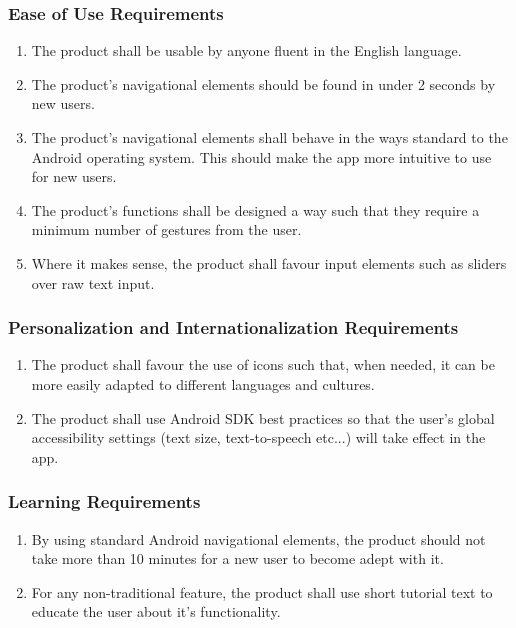 \documentclass[]{article}
\begin{document}
\subsubsection{Ease of Use Requirements}
\label{ssub:ease_of_use_requirements}
\begin{enumerate}[{UH}1. ]
	\item The product shall be usable by anyone fluent in the English language.
	\item The product's navigational elements should be found in under 2 seconds by new users.
	\item The product's navigational elements shall behave in the ways standard to the Android operating system. This should make the app more intuitive to use for new users. 
	\item The product's functions shall be designed a way such that they require a minimum number of gestures from the user.
	\item Where it makes sense, the product shall favour input elements such as sliders over raw text input.
	\holdEnum
\end{enumerate}

\subsubsection{Personalization and Internationalization Requirements}
\label{ssub:personalization_and_internationalization_requirements}
\begin{enumerate}[{UH}1. ]
	\resumeEnum
	\item The product shall favour the use of icons such that, when needed, it can be more easily adapted to different languages and cultures.
	\item The product shall use Android SDK best practices so that the user's global accessibility settings (text size, text-to-speech etc...) will take effect in the app. 
	\holdEnum
\end{enumerate}

\subsubsection{Learning Requirements}
\label{ssub:learning_requirements}
\begin{enumerate}[{UH}1. ]
	\resumeEnum
	\item By using standard Android navigational elements, the product should not take more than 10 minutes for a new user to become adept with it.
	\item For any non-traditional feature, the product shall use short tutorial text to educate the user about it's functionality.
	\holdEnum
\end{enumerate}
\end{document}
